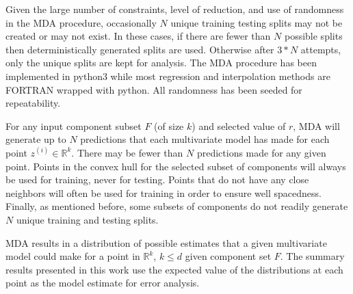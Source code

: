 \documentclass{scspaperproc}
\theoremstyle{scsthe}
\begin{document}
Given the large number of constraints, level of reduction, and use of
randomness in the MDA procedure, occasionally $N$ unique training
testing splits may not be created or may not exist. In these cases, if
there are fewer than $N$ possible splits then deterministically
generated splits are used. Otherwise after $3*N$ attempts, only the
unique splits are kept for analysis. The MDA procedure has been
implemented in python3 while most regression and interpolation methods
are FORTRAN wrapped with python. All randomness has been seeded for
repeatability.

For any input component subset $F$ (of size $k$) and selected value of
$r$, MDA will generate up to $N$ predictions that each multivariate
model has made for each point $z^{(i)} \in \mathbb{R}^k$. There may be
fewer than $N$ predictions made for any given point. Points in the
convex hull for the selected subset of components will always be used
for training, never for testing. Points that do not have any close
neighbors will often be used for training in order to ensure well
spacedness. Finally, as mentioned before, some subsets of components
do not readily generate $N$ unique training and testing splits.

MDA results in a distribution of possible estimates that a given
multivariate model could make for a point in $\mathbb{R}^k$, $k \leq
d$ given component set $F$. The summary results presented in this work
use the expected value of the distributions at each point as the model
estimate for error analysis.



\end{document}
